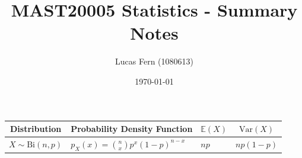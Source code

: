 \documentclass{article}
\title{MAST20005 Statistics - Summary Notes}
\date{\today}
\author{Lucas Fern (1080613)}
\begin{document}
\begin{table}[h!]
    \vspace{-0.35cm}
    \centering
    \begin{tabular}{@{}llll@{}}
    \multicolumn{1}{c}{\textbf{Distribution}}       & \multicolumn{1}{c}{\textbf{Probability Density Function}}                                                                          & \multicolumn{1}{c}{\textbf{$\mathbb{E}(X)$}}                & \multicolumn{1}{c}{\textbf{$\mbox{Var}(X)$}}                                                                       \\ \midrule
    $X \sim \mbox{Bi}(n,p)$                & $p_X(x)={\binom{n}{x}}p^x(1-p)^{n-x}$                                                                                              & $np$                                                        & $np(1-p)$                                                                                                          \\ \midrule

\end{tabular}
\end{table}
\end{document}
